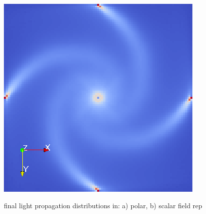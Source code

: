 \documentclass{scrartcl}
\begin{document}
\begin{figure}[!t]
\begin{minipage}{0.25\textwidth}
    \includegraphics[height=0.8\textwidth]{spiral_full.png}
    \label{b)}
  \end{minipage}
\caption{final light propagation distributions in: a) polar, b) scalar field rep}
\label{rings-tests}
\end{figure}



%
%
%
\end{document}
